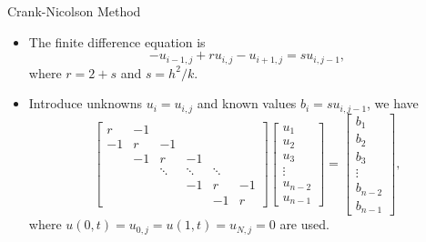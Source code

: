 \documentclass{beamer}
\begin{document}
\begin{frame}{Crank-Nicolson Method}
    \begin{itemize}
        \item The finite difference equation is
        \[
        -u_{i-1,j}+r u_{i,j}-u_{i+1,j}=s u_{i,j-1},
        \] 
        where $r=2+s$ and $s=h^2/k$.
        \item Introduce unknowns $u_i=u_{i,j}$ and known values $b_i=s u_{i,j-1}$, we have 
$$
\left[\begin{array}{rrrrrr}
r & -1 & & & & \\
-1 & r & -1 & & & \\
& -1 & r & -1 & & \\
& & \ddots & \ddots & \ddots & \\
& & & -1 & r & -1 \\
& & & & -1 & r
\end{array}\right]\left[\begin{array}{c}
u_1 \\
u_2 \\
u_3 \\
\vdots \\
u_{n-2} \\
u_{n-1}
\end{array}\right]=\left[\begin{array}{c}
b_1 \\
b_2 \\
b_3 \\
\vdots \\
b_{n-2} \\
b_{n-1}
\end{array}\right],
$$
where $u(0,t)=u_{0,j}=u(1,t)=u_{N,j}=0$ are used.
\end{itemize}
\end{frame}
\end{document}
